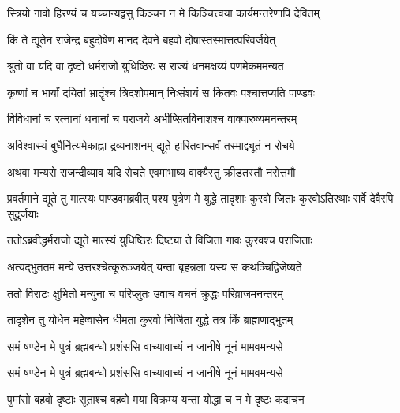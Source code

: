 


\twolineshloka
{स्त्रियो गावो हिरण्यं च यच्चान्यद्वसु किञ्चन}
{न मे किञ्चित्त्वया कार्यमन्तरेणापि देवितम्}




\twolineshloka
{किं ते द्यूतेन राजेन्द्र बहुदोषेण मानद}
{देवने बहवो दोषास्तस्मात्तत्परिवर्जयेत्}


\twolineshloka
{श्रुतो वा यदि वा दृष्टो धर्मराजो युधिष्ठिरः}
{स राज्यं धनमक्षय्यं पणमेकममन्यत}


\twolineshloka
{कृष्णां च भार्यां दयितां भ्रातॄंश्च त्रिदशोपमान्}
{निःसंशयं स कितवः पश्चात्तप्यति पाण्डवः}


\twolineshloka
{विविधानां च रत्नानां धनानां च पराजये}
{अभीप्सितविनाशश्च वाक्पारुष्यमनन्तरम्}


\twolineshloka
{अविश्वास्यं बुधैर्नित्यमेकाह्ना द्रव्यनाशनम्}
{द्यूते हारितवान्सर्वं तस्माद्द्यूतं न रोचये}


\twolineshloka
{अथवा मन्यसे राजन्दीव्याव यदि रोचते}
{एवमाभाष्य वाक्यैस्तु क्रीडतस्तौ नरोत्तमौ}


\onelineshloka
{प्रवर्तमाने द्यूते तु मात्स्यः पाण्डवमब्रवीत्}
\twolineshloka
{पश्य पुत्रेण मे युद्धे तादृशाः कुरवो जिताः}
{कुरवोऽतिरथाः सर्वे देवैरपि सुदुर्जयाः}


\twolineshloka
{ततोऽब्रवीद्धर्मराजो द्यूते मात्स्यं युधिष्ठिरः}
{दिष्ट्या ते विजिता गावः कुरवश्च पराजिताः}


\twolineshloka
{अत्यद्भुततमं मन्ये उत्तरश्चेत्कूरूञ्जयेत्}
{यन्ता बृहन्नला यस्य स कथञ्चिद्विजेष्यते}


\twolineshloka
{ततो विराटः क्षुभितो मन्युना च परिप्लुतः}
{उवाच वचनं क्रुद्धः परिव्राजमनन्तरम्}


\twolineshloka
{तादृशेन तु योधेन महेष्वासेन धीमता}
{कुरवो निर्जिता युद्धे तत्र किं ब्राह्मणाद्भुतम्}




\twolineshloka
{समं षण्डेन मे पुत्रं ब्रह्मबन्धो प्रशंससि}
{वाच्यावाच्यं न जानीषे नूनं मामवमन्यसे}




\twolineshloka
{समं षण्डेन मे पुत्रं ब्रह्मबन्धो प्रशंससि}
{वाच्यावाच्यं न जानीषे नूनं मामवमन्यसे}


\twolineshloka
{पुमांसो बहवो दृष्टाः सूताश्च बहवो मया}
{विक्रम्य यन्ता योद्धा च न मे दृष्टः कदाचन}


